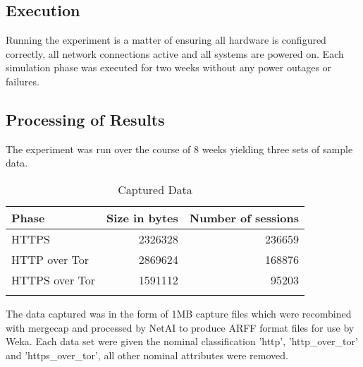 \subsection{Execution}

Running the experiment is a matter of ensuring all hardware is configured
correctly, all network connections active and all systems are powered on. Each
simulation phase was executed for two weeks without any power outages or
failures.

\subsection{Processing of Results}

The experiment was run over the course of 8 weeks yielding three sets of sample
data.

\begin{table}[H]
  \begin{tabular}{lrr}
    \toprule
    Phase & Size in bytes & Number of sessions\\
    \midrule
    HTTPS & 2326328 & 236659\\
    HTTP over Tor & 2869624 & 168876\\
    HTTPS over Tor & 1591112 & 95203\\
    \bottomrule
    \label{table:datasets}
  \end{tabular}
  \caption{Captured Data}
\end{table}

The data captured was in the form of 1MB capture files which were recombined
with mergecap and processed by NetAI to produce ARFF format files for use by
Weka. Each data set were given the nominal classification 'http',
'http\_over\_tor' and 'https\_over\_tor', all other nominal attributes were
removed.

